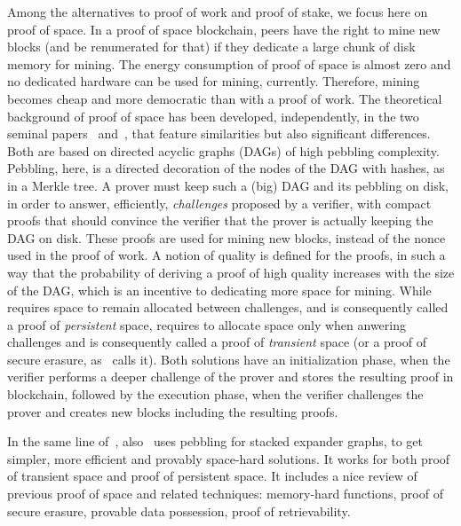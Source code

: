Among the alternatives to proof of work and proof of stake, we focus here on proof of space.
In a proof of space blockchain, peers have the right to mine new blocks (and be renumerated for that) if they dedicate
a large chunk of disk memory for mining. The energy consumption of proof of space is almost zero
and no dedicated hardware can be used for mining, currently. Therefore, mining becomes cheap and
more democratic than with a proof of work.
The theoretical background of proof of space has been developed, independently,
in the two seminal papers~\cite{AtenieseBFG14} and~\cite{DziembowskiFKP15},
that feature similarities but also significant differences. Both are based
on directed acyclic graphs (DAGs) of high pebbling complexity.
Pebbling, here, is a directed decoration of the nodes of the DAG with hashes, as in
a Merkle tree.
A prover must keep such a (big) DAG and its pebbling on disk, in order to answer, efficiently,
\emph{challenges} proposed by a verifier, with compact proofs that should convince the verifier that
the prover is actually keeping the DAG on disk. These proofs are used for mining new blocks,
instead of the nonce used in the proof of work. A notion of quality is defined for
the proofs, in such a way that the probability of deriving a proof of high quality increases
with the size of the DAG, which is an incentive to dedicating more space for mining.
While~\cite{DziembowskiFKP15} requires space to remain allocated between challenges,
and is consequently called a proof of \emph{persistent} space, \cite{AtenieseBFG14} requires
to allocate space only when anwering challenges and is consequently called
a proof of \emph{transient} space (or a proof of secure erasure, as~\cite{DziembowskiFKP15} calls it).
Both solutions have an initialization phase, when the verifier performs a deeper challenge
of the prover and stores the resulting proof in blockchain, followed by the execution phase,
when the verifier challenges the prover and creates new blocks including the resulting proofs.

In the same line of~\cite{AtenieseBFG14,DziembowskiFKP15}, also~\cite{RenD16} uses
pebbling for stacked expander graphs, to get simpler, more efficient and
provably space-hard solutions.
It works for both proof of transient space and proof of persistent space.
It includes a nice review of previous proof of space
and related techniques: memory-hard functions, proof of secure erasure, provable data possession,
proof of retrievability.

